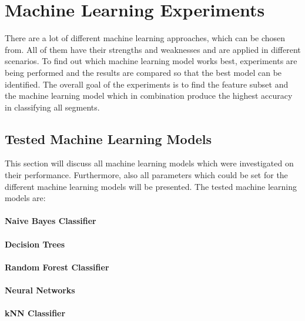 \section{Machine Learning Experiments}
\label{sec:machine_learning_experiments}

There are a lot of different machine learning approaches, which can be chosen from. All of them have their strengths and weaknesses and are applied in different scenarios. To find out which machine learning model works best, experiments are being performed and the results are compared so that the best model can be identified. 
The overall goal of the experiments is to find the feature subset and the machine learning model which in combination produce the highest accuracy in classifying all segments. 





\subsection{Tested Machine Learning Models}
\label{sec:machine_learning_models}

This section will discuss all machine learning models which were investigated on their performance. Furthermore, also all parameters which could be set for the different machine learning models will be presented. The tested machine learning models are:


\paragraph{Naive Bayes Classifier}
\paragraph{Decision Trees}
\paragraph{Random Forest Classifier}
\paragraph{Neural Networks}
\paragraph{kNN Classifier}
